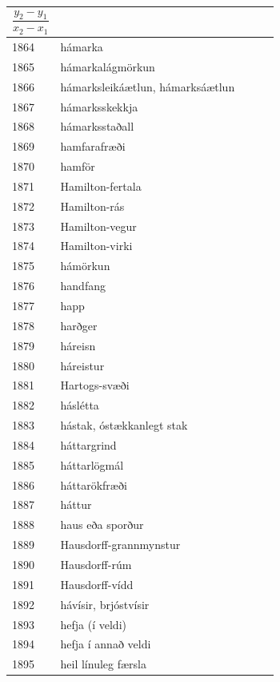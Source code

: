 \begin{longtable}{p{}|p{}|p{}|p{}|p{}}
\[
\frac{y_2-y_1}{x_2-x_1}
\] &  & \\
\hline
1864 & hámarka &  &  &  \\
\hline
1865 & hámarkalágmörkun &  &  &  \\
\hline
1866 & hámarksleikáætlun, hámarksáætlun &  &  &  \\
\hline
1867 & hámarksskekkja &  &  &  \\
\hline
1868 & hámarksstaðall &  &  &  \\
\hline
1869 & hamfarafræði &  &  &  \\
\hline
1870 & hamför &  &  &  \\
\hline
1871 & Hamilton-fertala &  &  &  \\
\hline
1872 & Hamilton-rás &  &  &  \\
\hline
1873 & Hamilton-vegur &  &  &  \\
\hline
1874 & Hamilton-virki &  &  &  \\
\hline
1875 & hámörkun &  &  &  \\
\hline
1876 & handfang &  &  &  \\
\hline
1877 & happ &  &  &  \\
\hline
1878 & harðger &  &  &  \\
\hline
1879 & háreisn &  &  &  \\
\hline
1880 & háreistur &  &  &  \\
\hline
1881 & Hartogs-svæði &  &  &  \\
\hline
1882 & háslétta &  &  &  \\
\hline
1883 & hástak, óstækkanlegt stak &  &  &  \\
\hline
1884 & háttargrind &  &  &  \\
\hline
1885 & háttarlögmál &  &  &  \\
\hline
1886 & háttarökfræði &  &  &  \\
\hline
1887 & háttur &  &  &  \\
\hline
1888 & haus eða sporður &  &  &  \\
\hline
1889 & Hausdorff-grannmynstur &  &  &  \\
\hline
1890 & Hausdorff-rúm &  &  &  \\
\hline
1891 & Hausdorff-vídd &  &  &  \\
\hline
1892 & hávísir, brjóstvísir &  &  &  \\
\hline
1893 & hefja (í veldi) &  &  &  \\
\hline
1894 & hefja í annað veldi &  &  &  \\
\hline
1895 & heil línuleg færsla &  &  &  \\

\end{longtable}
